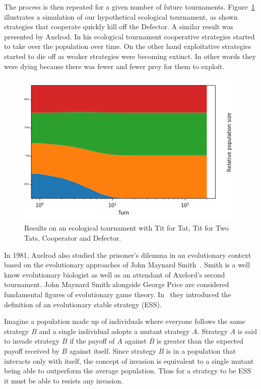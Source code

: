 \documentclass{article}
\theoremstyle{definition}
\begin{document}
The process is then repeated for a given number of future tournaments.
Figure~\ref{fig:ecological_tournament} illustrates a simulation of our hypothetical
ecological tournament, as shown strategies that cooperate quickly kill off the Defector.
A similar result was presented by Axelrod. In his ecological tournament cooperative
strategies started to take over the population over time. On the other hand exploitative
strategies started to die off as weaker strategies were becoming extinct. In other
words they were dying because there was fewer and fewer prey for them to exploit.


\begin{figure}[!hbtp]
    \centering
    \includegraphics[width=.6\textwidth]{./assets/images/ecological_tournament.png}
    \caption{Results on an ecological tournament with Tit for Tat, Tit for Two Tats,
    Cooperator and Defector.}
    \label{fig:ecological_tournament}
\end{figure}

In 1981, Axelrod also studied the prisoner's dilemma in an evolutionary context based
on the evolutionary approaches of John Maynard Smith~\cite{Smith1973,
Smith1974, Smith1979}. Smith is a well know evolutionary biologist as well
as an attendant of Axelord's second tournament. John Maynard Smith alongside George Price
are considered fundamental figures of evolutionary game theory. In~\cite{Smith1973}
they introduced the definition of an evolutionary stable strategy (ESS).


Imagine a population made up of individuals where everyone follows the
same strategy \(B\) and a single individual adopts a mutant strategy \(A\).
Strategy \(A\) is said to invade strategy \(B\) if the payoff of \(A\) against \(B\)
is greater than the expected payoff received by \(B\) against itself.
Since strategy \(B\) is in a population that interacts only with itself,
the concept of invasion is equivalent to a single mutant being able to outperform
the average population. Thus for a strategy to be ESS it must be able to resists
any invasion.
\end{document}
